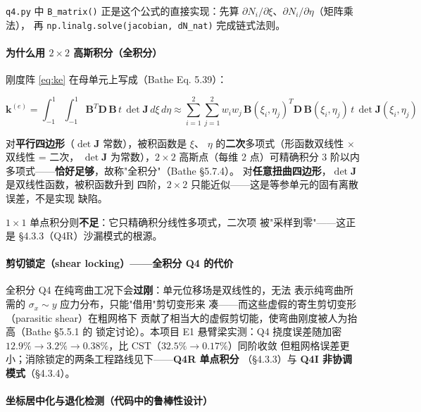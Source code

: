 \documentclass[12pt,a4paper]{ctexart}
\newcommand{\fem}{\Verb}
\begin{document}
\fem|q4.py| 中 \fem|B_matrix()| 正是这个公式的直接实现：先算
$\partial N_i/\partial\xi$、$\partial N_i/\partial\eta$（矩阵乘法），
再 \fem|np.linalg.solve(jacobian, dN_nat)| 完成链式法则。

\paragraph{为什么用 $2\times2$ 高斯积分（全积分）}

刚度阵 \eqref{eq:ke} 在母单元上写成（Bathe Eq. 5.39）：

\begin{equation}
\mathbf{k}^{(e)} = \int_{-1}^{1}\int_{-1}^{1}
\mathbf{B}^T \mathbf{D}\,\mathbf{B}\,t\,\det\mathbf{J}\,d\xi\,d\eta
\approx \sum_{i=1}^{2} \sum_{j=1}^{2}
w_i w_j\, \mathbf{B}(\xi_i,\eta_j)^T \mathbf{D}\,\mathbf{B}(\xi_i,\eta_j)\,t\,\det\mathbf{J}(\xi_i,\eta_j)
\label{eq:q4-gauss}
\end{equation}

对\textbf{平行四边形}（$\det\mathbf{J}$ 常数），被积函数是 $\xi$、
$\eta$ 的\textbf{二次}多项式（形函数双线性 $\times$ 双线性 = 二次，
$\det\mathbf{J}$ 为常数），$2\times2$ 高斯点（每维 2 点）可精确积分
$3$ 阶以内多项式——\textbf{恰好足够}，故称"全积分"（Bathe §5.7.4）。
对\textbf{任意扭曲四边形}，$\det\mathbf{J}$ 是双线性函数，被积函数升到
四阶，$2\times2$ 只能近似——这是等参单元的固有离散误差，不是实现
缺陷。

$1\times1$ 单点积分则\textbf{不足}：它只精确积分线性多项式，二次项
被"采样到零"——这正是 §4.3.3（Q4R）沙漏模式的根源。

\paragraph{剪切锁定（shear locking）——全积分 Q4 的代价}

全积分 Q4 在纯弯曲工况下会\textbf{过刚}：单元位移场是双线性的，无法
表示纯弯曲所需的 $\sigma_x \sim y$ 应力分布，只能"借用"剪切变形来
凑——而这些虚假的寄生剪切变形（parasitic shear）在粗网格下
贡献了相当大的虚假剪切能，使弯曲刚度被人为抬高（Bathe §5.5.1 的
锁定讨论）。本项目 E1 悬臂梁实测：Q4 挠度误差随加密
$12.9\% \to 3.2\% \to 0.38\%$，比 CST（$32.5\% \to 0.17\%$）同阶收敛
但粗网格误差更小；消除锁定的两条工程路线见下——\textbf{Q4R 单点积分}
（§4.3.3）与 \textbf{Q4I 非协调模式}（§4.3.4）。

\paragraph{坐标居中化与退化检测（代码中的鲁棒性设计）}
\end{document}
